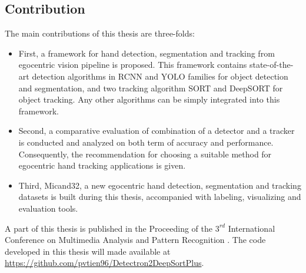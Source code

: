 \subsection{Contribution}
The main contributions of this thesis are three-folds:
\begin{itemize}
	\item First, a framework for hand detection, segmentation and tracking from egocentric vision pipeline is proposed. This framework contains state-of-the-art detection algorithms in RCNN and YOLO families for object detection and segmentation, and two tracking algorithm SORT and DeepSORT for object tracking. Any other algorithms can be simply integrated into this framework.
	\item Second, a comparative evaluation of combination of a detector and a tracker is conducted and analyzed on both term of accuracy and performance. Consequently, the recommendation for choosing a suitable method for egocentric hand tracking applications is given.
	\item Third, Micand32, a new egocentric hand detection, segmentation and tracking datasets is built during this thesis, accompanied with labeling, visualizing and evaluation tools.
\end{itemize}
A part of this thesis is published in the Proceeding of the \(3^{rd}\) International Conference on Multimedia Analysis and Pattern Recognition \cite{tien}. The code developed in this thesis will made available at  \url{https://github.com/pvtien96/Detectron2DeepSortPlus}.
